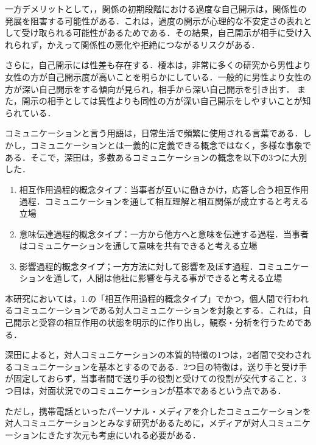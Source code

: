 一方デメリットとして，，関係の初期段階における過度な自己開示は，関係性の発展を阻害する可能性がある．これは，過度の開示が心理的な不安定さの表れとして受け取られる可能性があるためである．その結果，自己開示が相手に受け入れられず，かえって関係性の悪化や拒絶につながるリスクがある．%

さらに，自己開示には性差も存在する．榎本\cite{榎本_1997_自己開示の心理学的研究}は，非常に多くの研究から男性より女性の方が自己開示度が高いことを明らかにしている．一般的に男性より女性の方が深い自己開示をする傾向が見られ，相手から深い自己開示を引き出す．
また，開示の相手としては異性よりも同性の方が深い自己開示をしやすいことが知られている\cite{武田裕子_2013}．%


コミュニケーションと言う用語は，日常生活で頻繁に使用される言葉である．しかし，コミュニケーションとは一義的に定義できる概念ではなく，多様な事象である．そこで，深田\cite{深田_2000}は，多数あるコミュニケーションの概念を以下の3つに大別した．

\begin{enumerate}
    \item 相互作用過程的概念タイプ：当事者が互いに働きかけ，応答し合う相互作用過程．コミュニケーションを通して相互理解と相互関係が成立すると考える立場
    \item 意味伝達過程的概念タイプ：一方から他方へと意味を伝達する過程．当事者はコミュニケーションを通して意味を共有できると考える立場
    \item 影響過程的概念タイプ；一方方法に対して影響を及ぼす過程．コミュニケーションを通して，人間は他社に影響を与える事ができると考える立場
\end{enumerate}

本研究においては，1.の「相互作用過程的概念タイプ」でかつ，個人間で行われるコミュニケーションである対人コミュニケーションを対象とする．これは，自己開示と受容の相互作用の状態を明示的に作り出し，観察・分析を行うためである．

深田\cite{深田_2000}によると，対人コミュニケーションの本質的特徴の1つは，2者間で交わされるコミュニケーションを基本とするのである．2つ目の特徴は，送り手と受け手が固定しておらず，当事者間で送り手の役割と受けての役割が交代すること．3つ目は，対面状況でのコミュニケーションが基本であるという点である．

ただし，携帯電話といったパーソナル・メディアを介したコミュニケーションを対人コミュニケーションとみなす研究があるために，メディアが対人コミュニケーションにきたす次元も考慮にいれる必要がある．


